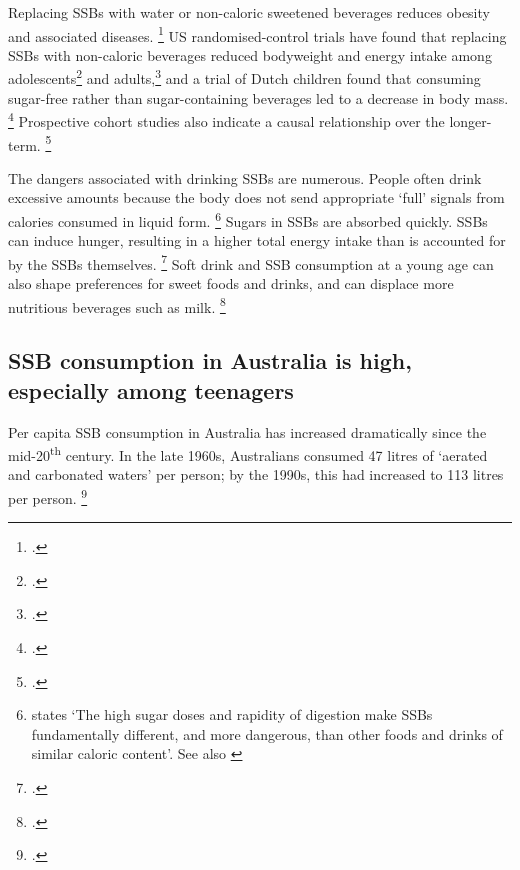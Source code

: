 \documentclass[embargoed]{grattan}
\begin{document}
Replacing SSBs with water or non-caloric sweetened beverages reduces obesity and associated diseases.%
\footcite{Malik2006Intakesugarsweetened} US randomised-control trials have found that replacing SSBs with non-caloric beverages reduced bodyweight and energy intake among adolescents\footcite{Ebbeling2002Childhoodobesitypublic} and adults,\footcite{Chen2009Reductionconsumptionsugar} and a trial of Dutch children found that consuming sugar-free rather than sugar-containing beverages led to a decrease in body mass.%
\footcites{Ruyter2012trialsugarfree}{Malik2006Intakesugarsweetened} Prospective cohort studies also indicate a causal relationship over the longer-term.%
\footcites{Hu2013Resolvedthereis}{Malik2006Intakesugarsweetened}{TeMorenga2013Dietarysugarsbody}

The dangers associated with drinking SSBs are numerous.
People often drink excessive amounts because the body does not send appropriate `full' signals from calories consumed in liquid form.%
\footnote{\textcite{Mozaffarian2016politicssciencesoda} states `The high sugar doses and rapidity of digestion make SSBs fundamentally different, and more dangerous, than other foods and drinks of similar caloric content'.
See also \textcites{Fletcher2011Aresoftdrink}{Malik2006Intakesugarsweetened}{Ruyter2012trialsugarfree}{Johnson2009Dietarysugarsintake}{Gill2006weightevidencesuggests}{Panel2014POLICYBRIEFoptions}{Malik2010Sugarsweetenedbeverages}{Popkin2012Sugarybeveragesrepresent}{PublicHealth2016SugaryDrinks}{Health2013AustralianDietaryGuidelines}} Sugars in SSBs are absorbed quickly.
SSBs can induce hunger, resulting in a higher total energy intake than is accounted for by the SSBs themselves.%
\footcites{Vartanian2007Effectssoftdrink}{St-Onge2004Addedthermogenicsatiety} Soft drink and SSB consumption at a young age can also shape preferences for sweet foods and drinks, and can displace more nutritious beverages such as milk.%
\footcites{Popkin2012Sugarybeveragesrepresent}{Malik2006Intakesugarsweetened}{Vartanian2007Effectssoftdrink}

\subsection{SSB consumption in Australia is high, especially among teenagers}\label{ssb-consumption-in-australia-is-high-especially-among-teenagers}

Per capita SSB consumption in Australia has increased dramatically since the mid-20\textsuperscript{th} century.
In the late 1960s, Australians consumed 47 litres of `aerated and carbonated waters' per person; by the 1990s, this had increased to 113 litres per person.%
\footcite{ABS200043060Apparentconsumption}
\end{document}
